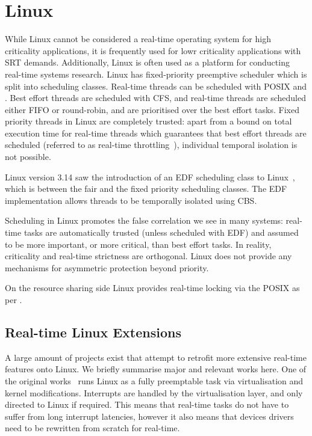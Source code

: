 \section{Linux}

While Linux cannot be considered a real-time operating system for high criticality applications, it
is frequently used for lowr criticality applications with \gls{SRT} demands.  Additionally, Linux
is often used as a platform for conducting real-time systems research. 
Linux has fixed-priority preemptive scheduler which is split into scheduling classes.  Real-time
threads can be scheduled with \gls{POSIX} \schedfifo and \schedsporadic. Best effort threads are
scheduled with \gls{CFS}, and real-time threads are scheduled either \gls{FIFO} or round-robin, and
are prioritised over the best effort tasks.  Fixed priority threads in Linux are completely trusted:
apart from a bound on total execution time for real-time threads which guarantees that best effort
threads are scheduled (referred to as real-time throttling~\citep{Corbet_08}), individual temporal
isolation is not possible.

Linux version 3.14 saw the introduction of an \gls{EDF} scheduling class to Linux~\citep{Corbet_09},
which is between the fair and the fixed priority scheduling classes.  The \gls{EDF} implementation
allows threads to be temporally isolated using \gls{CBS}.

Scheduling in Linux promotes the false correlation we see in many systems: real-time tasks are
automatically trusted (unless scheduled with \gls{EDF}) and assumed to be more important, or more
critical, than best effort tasks.  In reality, criticality and real-time strictness are orthogonal.
Linux does not provide any mechanisms for asymmetric protection beyond priority.

On the resource sharing side Linux provides real-time locking via the POSIX  as per
.
 
\subsection{Real-time Linux Extensions}

A large amount of projects exist that attempt to retrofit more extensive real-time features onto
Linux.  We briefly summarise major and relevant works here.  One of the original
works~\citep{Yodaiken_Barabanov_97} runs Linux as a fully preemptable task via virtualisation and
kernel modifications.  Interrupts are handled by the virtualisation layer, and only directed to
Linux if required.  This means that real-time tasks do not have to suffer from long interrupt
latencies, however it also means that devices drivers need to be rewritten from scratch for
real-time.

